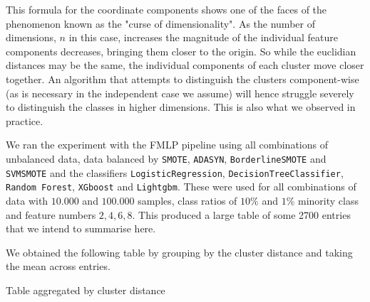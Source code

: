 This formula for the coordinate components shows one of the faces of the phenomenon known as the "curse of dimensionality".
As the number of dimensions, $n$ in this case, increases the magnitude of the individual feature components decreases, bringing them closer to the origin.
So while the euclidian distances may be the same, the individual components of each cluster move closer together.
An algorithm that attempts to distinguish the clusters component-wise (as is necessary in the independent case we assume) will hence struggle severely to
distinguish the classes in higher dimensions. This is also what we observed in practice.

We ran the experiment with the FMLP pipeline using all combinations of unbalanced data, data balanced by \texttt{SMOTE}, \texttt{ADASYN}, \texttt{BorderlineSMOTE} and 
\texttt{SVMSMOTE} and the classifiers \texttt{LogisticRegression}, \texttt{DecisionTreeClassifier}, \texttt{Random Forest}, \texttt{XGboost} and \texttt{Lightgbm}.
These were used for all combinations of data with $10.000$ and $100.000$ samples, class ratios of $10\%$ and $1\%$ minority class and feature numbers $2,4,6,8$.
This produced a large table of some 2700 entries that we intend to summarise here.

\begin{comment}
\begin{tabular}{|*{6}{|c}|}
	\bfseries {cluster distance} & \bfseries accuracy & \bfseries precision & \bfseries  recall & \bfseries {F1 score} & \bfseries {ROC AUC Score} \\%
	\csvreader[head to column names]{assets/tables/distance_mean_values.csv}{}{
	\csvcoli & \csvcolii & \csvcoliii & \csvcoliv & \csvcolv  & \csvcolvi %
	}%
	\\\hline
\end{tabular}
\end{comment}

We obtained the following table by grouping by the cluster distance and taking the mean across entries.
\begin{table}[H]
\centering
\caption{Table aggregated by cluster distance}
\end{table}

